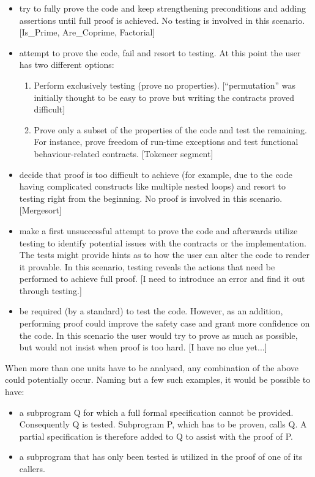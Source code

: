 \documentclass{llncs}
\begin{document}
\begin {itemize}
  \item try to fully prove the code and keep strengthening preconditions
    and adding assertions until full proof is achieved. No testing is
    involved in this scenario. [Is\_Prime, Are\_Coprime, Factorial]

  \item attempt to prove the code, fail and resort to testing. At this
    point the user has two different options:

    \begin{enumerate}
      \item Perform exclusively testing (prove no properties).
        [``permutation'' was initially thought to be easy to prove but writing
        the contracts proved difficult]

      \item Prove only a subset of the properties of the code and
        test the remaining. For instance, prove freedom of run-time
        exceptions and test functional behaviour-related contracts.
        [Tokeneer segment]
    \end{enumerate}

  \item decide that proof is too difficult to achieve (for example, due
    to the code having complicated constructs like multiple nested
    loops) and resort to testing right from the beginning. No proof
    is involved in this scenario. [Mergesort]

  \item make a first unsuccessful attempt to prove the code and afterwards
    utilize testing to identify potential issues with the contracts or
    the implementation. The tests might provide hints as to how the user
    can alter the code to render it provable. In this scenario, testing
    reveals the actions that need be performed to achieve full proof.
    [I need to introduce an error and find it out through testing.]

  \item be required (by a standard) to test the code. However, as an addition,
    performing proof could improve the safety case and grant more confidence on the
    code. In this scenario the user would try to prove as much as possible, but would
    not insist when proof is too hard.
    [I have no clue yet...]
\end{itemize}

When more than one units have to be analysed, any combination of the above could
potentially occur. Naming but a few such examples, it would be possible to have:
\begin{itemize}
  \item a subprogram Q for which a full formal specification cannot be provided.
    Consequently Q is tested. Subprogram P, which has to be proven, calls Q.
    A partial specification is therefore added to Q to assist with the proof of P.

  \item a subprogram that has only been tested is utilized in the proof of one of its
    callers.
\end{itemize}
\end{document}
